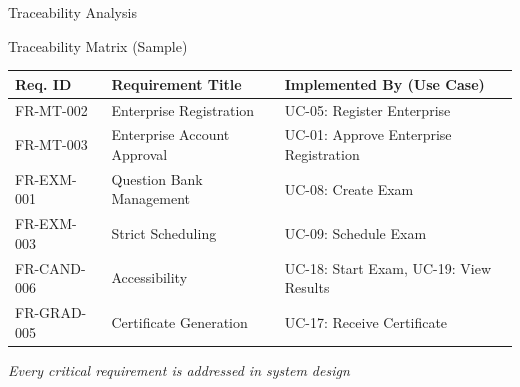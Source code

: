 \begin{frame}{Traceability Analysis}
    \begin{block}{Traceability Matrix (Sample)}
        \begin{table}[]
            \centering
            \small
            \begin{tabular}{|l|p{4cm}|p{4cm}|}
                \hline
                \textbf{Req. ID} & \textbf{Requirement Title} & \textbf{Implemented By (Use Case)} \\
                \hline
                FR-MT-002 & Enterprise Registration & UC-05: Register Enterprise \\
                \hline
                FR-MT-003 & Enterprise Account Approval & UC-01: Approve Enterprise Registration \\
                \hline
                FR-EXM-001 & Question Bank Management & UC-08: Create Exam \\
                \hline
                FR-EXM-003 & Strict Scheduling & UC-09: Schedule Exam \\
                \hline
                FR-CAND-006 & Accessibility & UC-18: Start Exam, UC-19: View Results \\
                \hline
                FR-GRAD-005 & Certificate Generation & UC-17: Receive Certificate \\
                \hline
            \end{tabular}
        \end{table}
    \end{block}
    
    \textit{Every critical requirement is addressed in system design}
\end{frame}
